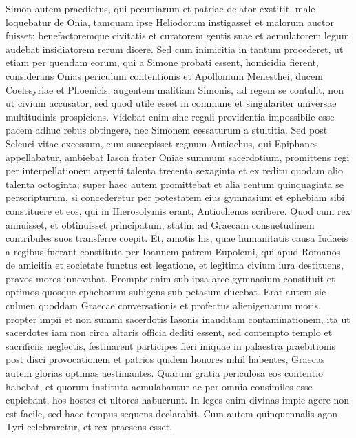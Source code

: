 \begin{biblechapter}  
\verse Simon autem praedictus, qui pecuniarum et patriae delator exstitit, male loquebatur de Onia, tamquam ipse Heliodorum instigasset et malorum auctor fuisset; 
\verse benefactoremque civitatis et curatorem gentis suae et aemulatorem legum audebat insidiatorem rerum dicere. 
\verse Sed cum inimicitia in tantum procederet, ut etiam per quendam eorum, qui a Simone probati essent, homicidia fierent, 
\verse considerans Onias periculum contentionis et Apollonium Menesthei, ducem Coelesyriae et Phoenicis, augentem malitiam Simonis, 
\verse ad regem se contulit, non ut civium accusator, sed quod utile esset in commune et singulariter universae multitudinis prospiciens. 
\verse Videbat enim sine regali providentia impossibile esse pacem adhuc rebus obtingere, nec Simonem cessaturum a stultitia. 
\verse Sed post Seleuci vitae excessum, cum suscepisset regnum Antiochus, qui Epiphanes appellabatur, ambiebat Iason frater Oniae summum sacerdotium, 
\verse promittens regi per interpellationem argenti talenta trecenta sexaginta et ex reditu quodam alio talenta octoginta; 
\verse super haec autem promittebat et alia centum quinquaginta se perscripturum, si concederetur per potestatem eius gymnasium et ephebiam sibi constituere et eos, qui in Hierosolymis erant, Antiochenos scribere. 
\verse Quod cum rex annuisset, et obtinuisset principatum, statim ad Graecam consuetudinem contribules suos transferre coepit. 
\verse Et, amotis his, quae humanitatis causa Iudaeis a regibus fuerant constituta per Ioannem patrem Eupolemi, qui apud Romanos de amicitia et societate functus est legatione, et legitima civium iura destituens, pravos mores innovabat. 
\verse Prompte enim sub ipsa arce gymnasium constituit et optimos quosque epheborum subigens sub petasum ducebat. 
\verse Erat autem sic culmen quoddam Graecae conversationis et profectus alienigenarum moris, propter impii et non summi sacerdotis Iasonis inauditam contaminationem, 
\verse ita ut sacerdotes iam non circa altaris officia dediti essent, sed contempto templo et sacrificiis neglectis, festinarent participes fieri iniquae in palaestra praebitionis post disci provocationem 
\verse et patrios quidem honores nihil habentes, Graecas autem glorias optimas aestimantes. 
\verse Quarum gratia periculosa eos contentio habebat, et quorum instituta aemulabantur ac per omnia consimiles esse cupiebant, hos hostes et ultores habuerunt. 
\verse In leges enim divinas impie agere non est facile, sed haec tempus sequens declarabit. 
\verse Cum autem quinquennalis agon Tyri celebraretur, et rex praesens esset, 

\end{biblechapter}

